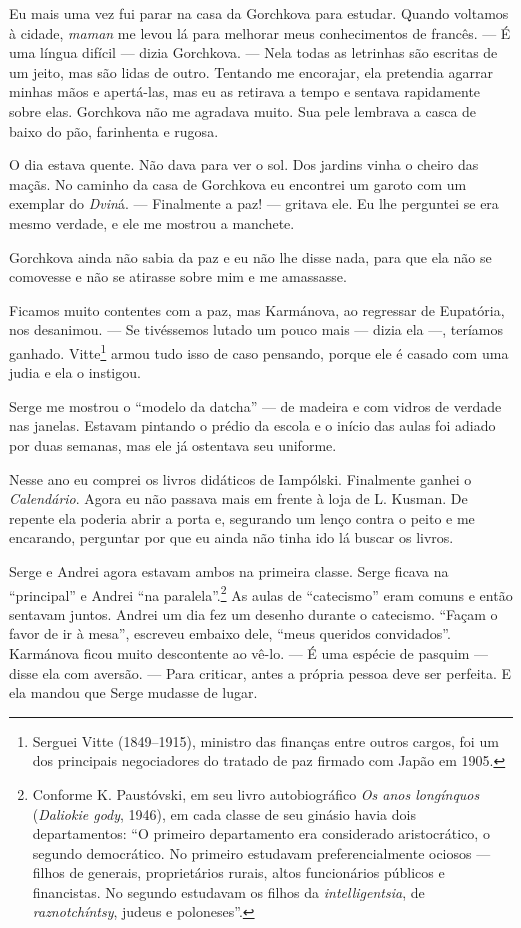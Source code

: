 Eu mais uma vez fui parar na casa da Gorchkova para estudar. Quando
voltamos à cidade, \emph{maman} me levou lá para melhorar meus
conhecimentos de francês. --- É uma língua difícil --- dizia Gorchkova.
--- Nela todas as letrinhas são escritas de um jeito, mas são lidas de
outro. Tentando me encorajar, ela pretendia agarrar minhas mãos e
apertá-las, mas eu as retirava a tempo e sentava rapidamente sobre elas.
Gorchkova não me agradava muito. Sua pele lembrava a casca de baixo do
pão, farinhenta e rugosa.

O dia estava quente. Não dava para ver o sol. Dos jardins vinha o cheiro
das maçãs. No caminho da casa de Gorchkova eu encontrei um garoto com um
exemplar do \emph{Dvin}á. --- Finalmente a paz! --- gritava ele. Eu lhe
perguntei se era mesmo verdade, e ele me mostrou a manchete.

Gorchkova ainda não sabia da paz e eu não lhe disse nada, para que ela
não se comovesse e não se atirasse sobre mim e me amassasse.

Ficamos muito contentes com a paz, mas Karmánova, ao regressar de
Eupatória, nos desanimou. --- Se tivéssemos lutado um pouco mais ---
dizia ela ---, teríamos ganhado. Vitte\footnote{Serguei Vitte
  (1849--1915), ministro das finanças entre outros cargos, foi um dos
  principais negociadores do tratado de paz firmado com Japão em 1905.}
armou tudo isso de caso pensando, porque ele é casado com uma judia e
ela o instigou.

Serge me mostrou o ``modelo da datcha'' --- de madeira e com vidros de
verdade nas janelas. Estavam pintando o prédio da escola e o início das
aulas foi adiado por duas semanas, mas ele já ostentava seu uniforme.

Nesse ano eu comprei os livros didáticos de Iampólski. Finalmente ganhei
o \emph{Calendário}. Agora eu não passava mais em frente à loja de L.
Kusman. De repente ela poderia abrir a porta e, segurando um lenço
contra o peito e me encarando, perguntar por que eu ainda não tinha ido
lá buscar os livros.

Serge e Andrei agora estavam ambos na primeira classe. Serge ficava na
``principal'' e Andrei ``na paralela''.\footnote{Conforme K. Paustóvski,
  em seu livro autobiográfico \emph{Os anos longínquos} (\emph{Daliokie
  gody}, 1946), em cada classe de seu ginásio havia dois departamentos:
  ``O primeiro departamento era considerado aristocrático, o segundo
  democrático. No primeiro estudavam preferencialmente ociosos ---
  filhos de generais, proprietários rurais, altos funcionários públicos
  e financistas. No segundo estudavam os filhos da
  \emph{intelligentsia}, de \emph{raznotchíntsy}, judeus e poloneses''.}
As aulas de ``catecismo'' eram comuns e então sentavam juntos. Andrei um
dia fez um desenho durante o catecismo. ``Façam o favor de ir à mesa'',
escreveu embaixo dele, ``meus queridos convidados''. Karmánova ficou
muito descontente ao vê-lo. --- É uma espécie de pasquim --- disse ela
com aversão. --- Para criticar, antes a própria pessoa deve ser
perfeita. E ela mandou que Serge mudasse de lugar.

